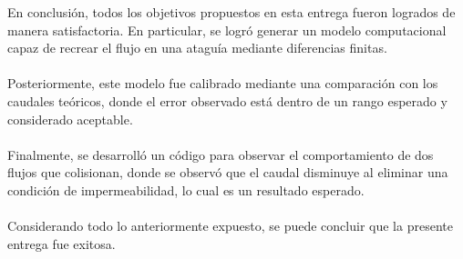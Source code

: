 En conclusión, todos los objetivos propuestos en esta entrega fueron logrados de manera satisfactoria. En particular, se logró generar un modelo computacional capaz de recrear el flujo en una ataguía mediante diferencias finitas.
\\ \\
Posteriormente, este modelo fue calibrado mediante una comparación con los caudales teóricos, donde el error observado está dentro de un rango esperado y considerado aceptable.
\\ \\
Finalmente, se desarrolló un código para observar el comportamiento de dos flujos que colisionan, donde se observó que el caudal disminuye al eliminar una condición de impermeabilidad, lo cual es un resultado esperado.
\\ \\
Considerando todo lo anteriormente expuesto, se puede concluir que la presente entrega fue exitosa.
